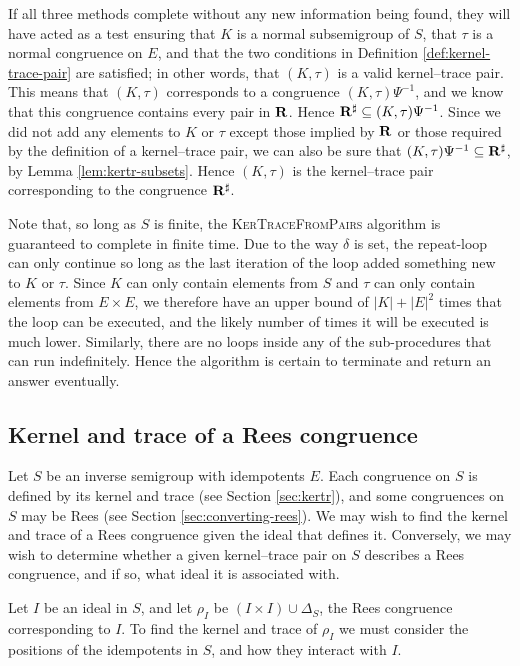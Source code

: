 If all three methods complete without any new information being found, they will
have acted as a test ensuring that
$K$ is a normal subsemigroup of $S$, that $\tau$ is a normal congruence on $E$,
and that the two conditions in Definition \ref{def:kernel-trace-pair} are
satisfied; in other words, that $(K, \tau)$ is a valid kernel--trace pair.
This means that $(K, \tau)$ corresponds to a congruence $(K,\tau)\Psi^{-1}$, and
we know that this congruence contains every pair in $\mathbf{R}$.  Hence
$\mathbf{R}^\sharp \subseteq (K,\tau)\Psi^{-1}$.  Since we did not add any
elements to $K$ or $\tau$ except those implied by $\mathbf{R}$ or those required
by the definition of a kernel--trace pair, we can also be sure that
$(K, \tau)\Psi^{-1} \subseteq \mathbf{R}^\sharp$, by Lemma
\ref{lem:kertr-subsets}.  Hence $(K, \tau)$ is the kernel--trace pair
corresponding to the congruence $\mathbf{R}^\sharp$.

Note that, so long as $S$ is finite, the \textsc{KerTraceFromPairs} algorithm is
guaranteed to complete in finite time.  Due to the way $\delta$ is set, the
repeat-loop can only continue so long as the last iteration of the loop added
something new to $K$ or $\tau$.  Since $K$ can only contain elements from $S$
and $\tau$ can only contain elements from $E \times E$, we therefore have an
upper bound of $|K| + |E|^2$ times that the loop can be executed, and the likely
number of times it will be executed is much lower.  Similarly, there are no
loops inside any of the sub-procedures that can run indefinitely.  Hence the
algorithm is certain to terminate and return an answer eventually.

\subsection{Kernel and trace of a Rees congruence}
\label{sec:rees-to-kertr}
Let $S$ be an inverse semigroup with idempotents $E$.  Each congruence on $S$ is
defined by its kernel and trace (see Section \ref{sec:kertr}), and some
congruences on $S$ may be Rees (see Section \ref{sec:converting-rees}).  We may wish
to find the kernel and trace of a Rees congruence given the ideal that defines
it.  Conversely, we may wish to determine whether a given kernel--trace pair on
$S$ describes a Rees congruence, and if so, what ideal it is associated with.

Let $I$ be an ideal in $S$, and let $\rho_I$ be $(I \times I) \cup \Delta_S$,
the Rees congruence corresponding to $I$.  To find the kernel and trace of
$\rho_I$ we must consider the positions of the idempotents in $S$, and how they
interact with $I$.

